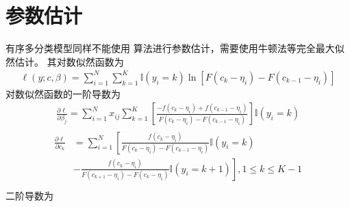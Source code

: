 \documentclass[letterpaper,10pt,english]{sphinxmanual}
\begin{document}
\section{参数估计}
\label{\detokenize{_u6709_u5e8f_u79bb_u6563_u6a21_u578b/content:id3}}
有序多分类模型同样不能使用  算法进行参数估计，需要使用牛顿法等完全最大似然估计。
其对数似然函数为
\begin{equation}\label{equation:有序离散模型/content:eq_ordered_logistic_012}
\begin{split}\ell(y;c,\beta) = \sum_{i=1}^N \sum_{k=1}^K
 \mathbb{I}(y_i=k) \ln  \left [
F(c_k - \eta_i) - F(c_{k-1} - \eta_i)
\right ]\end{split}
\end{equation}
对数似然函数的一阶导数为
\begin{equation}\label{equation:有序离散模型/content:有序离散模型/content:4}
\begin{split}\frac{\partial \ell }{\partial \beta_j}
= \sum_{i=1}^N x_{ij} \sum_{k=1}^K
\left [
\frac{-f(c_k - \eta_i) + f(c_{k-1} - \eta_i)}{F(c_k - \eta_i)-F(c_{k-1} - \eta_i)}
\right ]\mathbb{I}(y_i=k)\end{split}
\end{equation}\begin{align}\label{equation:有序离散模型/content:有序离散模型/content:5}\!\begin{aligned}
\frac{\partial \ell }{\partial c_k}
&= \sum_{i=1}^N
\left [
\frac{f(c_k - \eta_i)}{F(c_k - \eta_i)-F(c_{k-1} - \eta_i)} \mathbb{I}(y_i=k)
\right.\\
&\left. -\frac{f(c_k - \eta_i)}{F(c_{k+1} - \eta_i)-F(c_{k} - \eta_i)} \mathbb{I}(y_i=k+1)
\right ] , 1 \le k \le K-1\\
\end{aligned}\end{align}
二阶导数为
\end{document}

